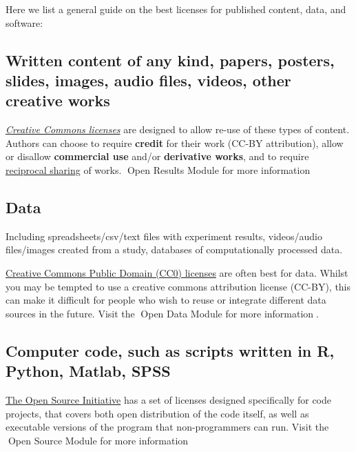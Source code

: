 \documentclass[
  letterpaper,
  DIV=11,
  numbers=noendperiod]{scrreport}
\begin{document}
Here we list a general guide on the best licenses for published content,
data, and software:

\hypertarget{written-content-of-any-kind-papers-posters-slides-images-audio-files-videos-other-creative-works}{%
\subsection{Written content of any kind, papers, posters, slides,
images, audio files, videos, other creative
works}\label{written-content-of-any-kind-papers-posters-slides-images-audio-files-videos-other-creative-works}}

\emph{\href{https://creativecommons.org/}{Creative Commons licenses}}
are designed to allow re-use of these types of content. Authors can
choose to require \textbf{credit} for their work (CC-BY attribution),
allow or disallow \textbf{commercial use} and/or \textbf{derivative
works}, and to require
\href{https://en.wikipedia.org/wiki/Share-alike}{reciprocal sharing} of
works. 🔗Open Results Module for more information🔗

\hypertarget{data}{%
\subsection{Data}\label{data}}

Including spreadsheets/csv/text files with experiment results,
videos/audio files/images created from a study, databases of
computationally processed data.

\href{https://creativecommons.org/publicdomain/zero/1.0/}{Creative
Commons Public Domain (CC0) licenses} are often best for data. Whilst
you may be tempted to use a creative commons attribution license
(CC-BY), this can make it difficult for people who wish to reuse or
integrate different data sources in the future. Visit the 🔗Open Data
Module for more information🔗.

\hypertarget{computer-code-such-as-scripts-written-in-r-python-matlab-spss}{%
\subsection{Computer code, such as scripts written in R, Python, Matlab,
SPSS}\label{computer-code-such-as-scripts-written-in-r-python-matlab-spss}}

\href{https://opensource.org/licenses}{The Open Source Initiative} has a
set of licenses designed specifically for code projects, that covers
both open distribution of the code itself, as well as executable
versions of the program that non-programmers can run. Visit the 🔗Open
Source Module for more information🔗
\end{document}
